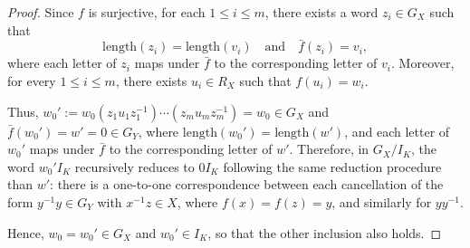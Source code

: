 \documentclass[10pt,a4paper]{amsart}
\begin{document}
\begin{proof}
Since $f$ is surjective, for each $1 \leq i \leq m$, there exists a word $z_i \in G_X$ such that
\[
\mathrm{length}(z_i) = \mathrm{length}(v_i)\quad\text{and} \quad \bar f(z_i) = v_i,
\]
where each letter of $z_i$ maps under $\bar f$ to the corresponding letter of $v_i$. Moreover, for every $1\leq i \leq m$, there exists $u_i \in R_X$ such that $f(u_i)=w_i$.

Thus, $w_0':= w_0(z_1u_1z_1^{-1})\cdots (z_mu_mz_m^{-1}) = w_0 \in G_X$ and $\bar f(w_0') = w' = 0 \in G_Y$, where $\mathrm{length}(w_0') = \mathrm{length}(w')$, and each letter of $w_0'$ maps under $\bar f$ to the corresponding letter of $w'$. Therefore, in $G_X/I_K$, the word $w_0'I_K$ recursively reduces to $0I_K$ following the same reduction procedure than $w'$: there is a one-to-one correspondence between each cancellation of the form $y^{-1}y \in G_Y$ with $x^{-1}z \in X$, where $f(x) = f(z) = y$, and similarly for $yy^{-1}$.

Hence, $w_0 = w_0'\in G_X$ and $w_0' \in I_K$, so that the other inclusion also holds.
\end{proof}
\end{document}
